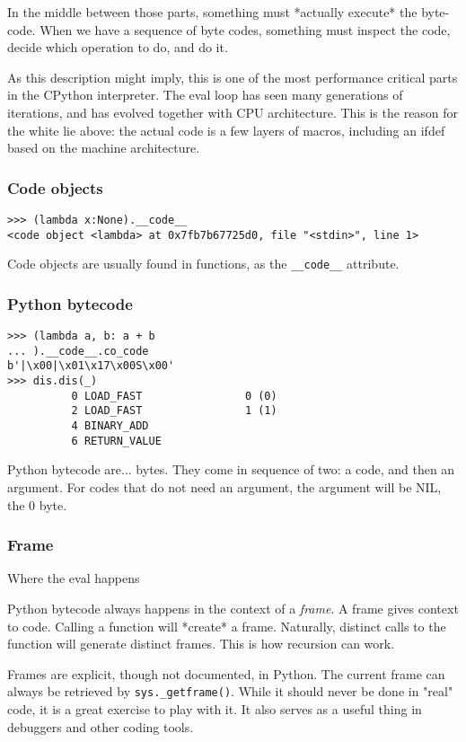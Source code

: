 In the middle between those parts,
something must
*actually execute*
the byte-code.
When we have a sequence of byte codes,
something must inspect the code,
decide which operation to do,
and do it.

As this description might imply,
this is one of the most performance critical parts
in the CPython interpreter.
The eval loop has seen many generations of iterations,
and has evolved together with CPU architecture.
This is the reason for the white lie above:
the actual code is a few layers of macros,
including an ifdef based on the machine architecture.


\begin{frame}[fragile]
\frametitle{Code objects}

\begin{lstlisting}
>>> (lambda x:None).__code__
<code object <lambda> at 0x7fb7b67725d0, file "<stdin>", line 1>
\end{lstlisting}

\end{frame}

Code objects are usually found in functions,
as the \verb|__code__| attribute.

\begin{frame}
\frametitle{Python bytecode}

\begin{lstlisting}
>>> (lambda a, b: a + b
... ).__code__.co_code
b'|\x00|\x01\x17\x00S\x00'
>>> dis.dis(_)
          0 LOAD_FAST                0 (0)
          2 LOAD_FAST                1 (1)
          4 BINARY_ADD
          6 RETURN_VALUE
\end{lstlisting}

\end{frame}

Python bytecode are...
bytes.
They come in sequence of two:
a code,
and then an argument.
For codes that do not need an argument,
the argument will be NIL,
the 0 byte.

\begin{frame}
\frametitle{Frame}

Where the eval happens
\end{frame}

Python bytecode always happens in the context of a
{\em frame}.
A frame gives context to code.
Calling a function will
*create*
a frame.
Naturally,
distinct calls to the function
will generate distinct frames.
This is how recursion can work.

Frames are explicit,
though not documented,
in Python.
The current frame can always be retrieved by
\verb|sys._getframe()|.
While it should never be done in
"real"
code,
it is a great exercise to play with it.
It also serves as a useful thing in debuggers
and other coding tools.

